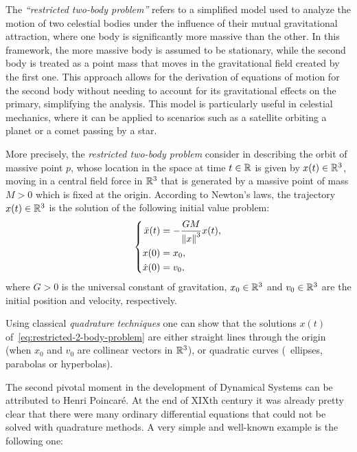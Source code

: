 \begin{problem}
  The \emph{``restricted two-body problem''} refers to a simplified model used to analyze the motion of two celestial bodies under the influence of their mutual gravitational attraction, where one body is significantly more massive than the other. In this framework, the more massive body is assumed to be stationary, while the second body is treated as a point mass that moves in the gravitational field created by the first one. This approach allows for the derivation of equations of motion for the second body without needing to account for its gravitational effects on the primary, simplifying the analysis. This model is particularly useful in celestial mechanics, where it can be applied to scenarios such as a satellite orbiting a planet or a comet passing by a star.

  More precisely, the \emph{restricted two-body problem} consider in describing the orbit of massive point $p$, whose location in the space at time $t\in\mathbb{R}$ is given by $x(t)\in\mathbb{R}^{3}$, moving in a central field force in $\mathbb{R}^{3}$ that is generated by a massive point of mass $M>0$ which is fixed at the origin. According to Newton's laws, the trajectory $x(t)\in\mathbb{R}^{3}$ is the solution of the following initial value problem:
  \begin{equation}
    \label{eq:restricted-2-body-problem}
    \left\{
      \begin{aligned}
        \ddot{x}(t) &= -\frac{GM}{\left\|{x}\right\|^{3}}x(t),\\
        x(0)&=x_{0},\\
        \dot{x}(0)&=v_{0},
      \end{aligned}
    \right.
  \end{equation}
  where $G>0$ is the universal constant of gravitation,  $x_{0}\in\mathbb{R}^{3}$ and $v_{0}\in\mathbb{R}^{3}$ are the initial position and velocity, respectively.

  Using classical \emph{quadrature techniques} one can show that the solutions $x(t)$ of~\eqref{eq:restricted-2-body-problem} are either straight lines through the origin (when $x_{0}$ and $v_{0}$ are collinear vectors in $\mathbb{R}^{3}$), or quadratic curves (\ie~ellipses, parabolas or hyperbolas).
\end{problem}

The second pivotal moment in the development of Dynamical Systems can be attributed to Henri Poincaré. At the end of XIXth century it was already pretty clear that there were many ordinary differential equations that could not be solved with quadrature methods. A very simple and well-known example is the following one:

